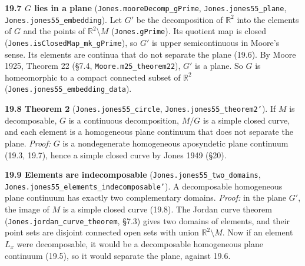 \documentclass[11pt]{article}
\newcommand{\lean}[1]{\texttt{#1}}
\begin{document}
\textbf{19.7 $G$ lies in a plane} (\lean{Jones.\hspace{0pt}mooreDecomp\_\hspace{0pt}gPrime}, \lean{Jones.\hspace{0pt}jones55\_\hspace{0pt}plane}, \lean{Jones.\hspace{0pt}jones55\_\hspace{0pt}embedding}). Let $G'$ be the decomposition of $\mathbb{R}^2$ into the elements of $G$ and the points of $\mathbb{R}^2 \setminus M$ (\lean{Jones.\hspace{0pt}gPrime}). Its quotient map is closed (\lean{Jones.\hspace{0pt}isClosedMap\_\hspace{0pt}mk\_\hspace{0pt}gPrime}), so $G'$ is upper semicontinuous in Moore's sense. Its elements are continua that do not separate the plane (19.6). By Moore 1925, Theorem 22 (\S{}7.4, \lean{Moore.\hspace{0pt}m25\_\hspace{0pt}theorem22}), $G'$ is a plane. So $G$ is homeomorphic to a compact connected subset of $\mathbb{R}^2$ (\lean{Jones.\hspace{0pt}jones55\_\hspace{0pt}embedding\_\hspace{0pt}data}).

\textbf{19.8 Theorem 2} (\lean{Jones.\hspace{0pt}jones55\_\hspace{0pt}circle}, \lean{Jones.\hspace{0pt}jones55\_\hspace{0pt}theorem2'}). If $M$ is decomposable, $G$ is a continuous decomposition, $M/G$ is a simple closed curve, and each element is a homogeneous plane continuum that does not separate the plane. \emph{Proof:} $G$ is a nondegenerate homogeneous aposyndetic plane continuum (19.3, 19.7), hence a simple closed curve by Jones 1949 (\S{}20).

\textbf{19.9 Elements are indecomposable} (\lean{Jones.\hspace{0pt}jones55\_\hspace{0pt}two\_\hspace{0pt}domains}, \lean{Jones.\hspace{0pt}jones55\_\hspace{0pt}elements\_\hspace{0pt}indecomposable'}). A decomposable homogeneous plane continuum has exactly two complementary domains. \emph{Proof:} in the plane $G'$, the image of $M$ is a simple closed curve (19.8). The Jordan curve theorem (\lean{Jones.\hspace{0pt}jordan\_\hspace{0pt}curve\_\hspace{0pt}theorem}, \S{}7.3) gives two domains of elements, and their point sets are disjoint connected open sets with union $\mathbb{R}^2 \setminus M$. Now if an element $L_x$ were decomposable, it would be a decomposable homogeneous plane continuum (19.5), so it would separate the plane, against 19.6.
\end{document}
